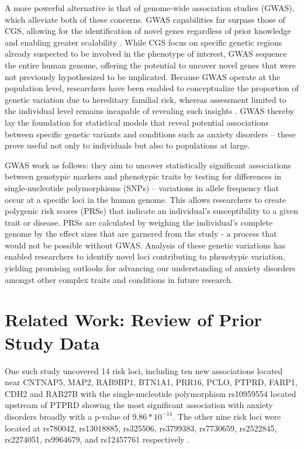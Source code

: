 \documentclass[12pt]{article}
\begin{document}
A more powerful alternative is that of genome-wide association studies (GWAS), which alleviate both of these concerns. GWAS capabilities far surpass those of CGS, allowing for the identification of novel genes regardless of prior knowledge and enabling greater scalability \cite{Amos2011}. While CGS focus on specific genetic regions already suspected to be involved in the phenotype of interest, GWAS sequence the entire human genome, offering the potential to uncover novel genes that were not previously hypothesized to be implicated. Because GWAS operate at the population level, researchers have been enabled to conceptualize the proportion of genetic variation due to hereditary familial risk, whereas assessment limited to the individual level remains incapable of revealing such insights \cite{Abdellaoui2023}. GWAS thereby lay the foundation for statistical models that reveal potential associations between specific genetic variants and conditions such as anxiety disorders -- these prove useful not only to individuals but also to populations at large. \par

GWAS work as follows: they aim to uncover statistically significant associations between genotypic markers and phenotypic traits by testing for differences in single-nucleotide polymorphisms (SNPs) -- variations in allele frequency that occur at a specific loci in the human genome. This allows researchers to create polygenic risk scores (PRSs) that indicate an individual's susceptibility to a given trait or disease. PRSs are calculated by weighing the individual's complete genome by the effect sizes that are garnered from the study - a process that would not be possible without GWAS. Analysis of these genetic variations has enabled researchers to identify novel loci contributing to phenotypic variation, yielding promising outlooks for advancing our understanding of anxiety disorders amongst other complex traits and conditions in future research. \par

\newpage

\section{Related Work: Review of Prior Study Data}
One such study uncovered 14 risk loci, including ten new associations located near CNTNAP5, MAP2, RAB9BP1, BTN1A1, PRR16, PCLO, PTPRD, FARP1, CDH2 and RAB27B with the single-nucleotide polymorphism rs10959554 located upstream of PTPRD showing the most significant association with anxiety disorders broadly with a p-value of $9.86*10^{-14}$. The other nine risk loci were located at rs780042, rs13018885, rs325506, rs3799383, rs7730659, rs2522845, rs2274051, rs9964679, and rs12457761 respectively \cite{Smith2023}. \par
\end{document}
